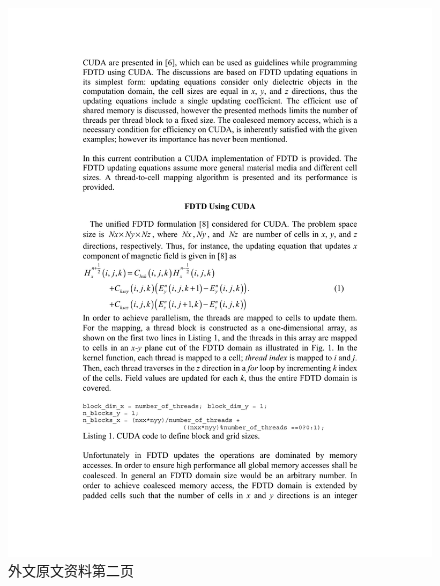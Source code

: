 \begin{figure}[h]
	\centering
	\includegraphics[width=1\linewidth]{../pics/p02}
	\caption{外文原文资料第二页}
	\label{fig:p02}
\end{figure}

